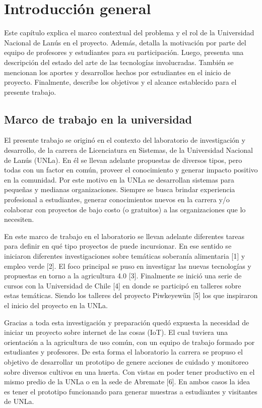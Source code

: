\chapter{Introducción general} %

Este capítulo explica el marco contextual del problema y el rol de la Universidad Nacional de Lanús en el proyecto. Además, detalla la motivación por parte del equipo de profesores y estudiantes para su participación. Luego, presenta una descripción del estado del arte de las tecnologías involucradas. También se mencionan los aportes y desarrollos hechos por estudiantes en el inicio de proyecto. Finalmente, describe los objetivos y el alcance establecido para el presente trabajo.

\section{Marco de trabajo en la universidad}
El presente trabajo se originó en el contexto del laboratorio de investigación y desarrollo, de la carrera de Licenciatura en Sistemas, de la Universidad Nacional de Lanús (UNLa). En él se llevan adelante propuestas de diversos tipos, pero todas con un factor en común, proveer el conocimiento y generar impacto positivo en la comunidad. Por este motivo en la UNLa se desarrollan sistemas para pequeñas y medianas organizaciones. Siempre se busca brindar experiencia profesional a estudiantes, generar conocimientos nuevos en la carrera y/o colaborar con proyectos de bajo costo (o gratuitos) a las organizaciones que lo necesiten.

En este marco de trabajo en el laboratorio se llevan adelante diferentes tareas para definir en qué tipo proyectos de puede incursionar. En ese sentido se iniciaron diferentes investigaciones sobre temáticas soberanía alimentaria [1] y empleo verde [2]. El foco principal se puso en investigar las nuevas tecnologías y propuestas en torno a la agricultura 4.0 [3]. Finalmente se inició una serie de cursos con la Universidad de Chile [4] en donde se participó en talleres sobre estas temáticas. Siendo los talleres del proyecto Piwkeyewün [5] los que inspiraron el inicio del proyecto en la UNLa.

Gracias a toda esta investigación y preparación quedó expuesta la necesidad de iniciar un proyecto sobre internet de las cosas (IoT). El cual tuviera una orientación a la agricultura de uso común, con un equipo de trabajo formado por estudiantes y profesores. De esta forma el laboratorio la carrera se propuso el objetivo de desarrollar un prototipo de genere acciones de cuidado y monitoreo sobre diversos cultivos en una huerta. Con vistas en poder tener productivo en el mismo predio de la UNLa o en la sede de Abremate [6]. En ambos casos la idea es tener el prototipo funcionando para generar muestras a estudiantes y visitantes de UNLa.

